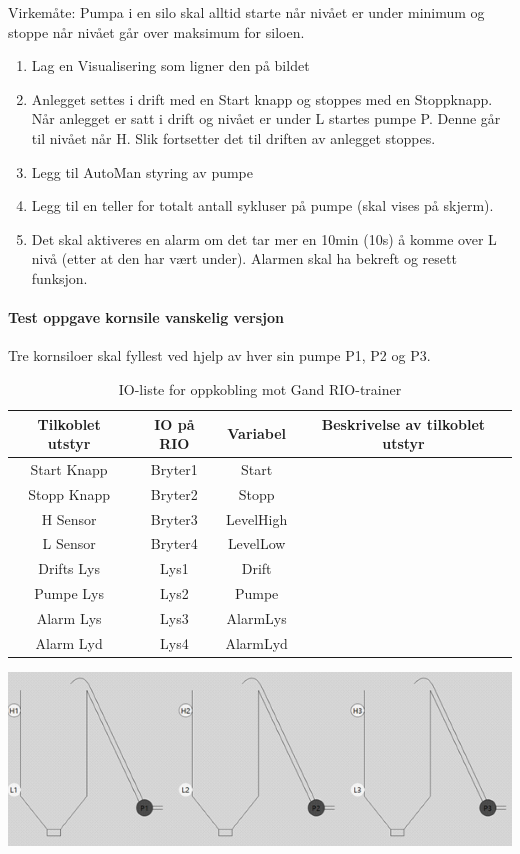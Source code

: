 \documentclass[12pt,a4paper]{article}
\begin{document}
Virkemåte: Pumpa i en silo skal alltid starte når nivået er under
minimum og stoppe når nivået går over maksimum for siloen.
\begin{enumerate}
\item Lag en Visualisering som ligner den på bildet
\item Anlegget settes i drift med en Start knapp og stoppes med en Stoppknapp.
Når anlegget er satt i drift og nivået er under L startes pumpe P.
Denne går til nivået når H. Slik fortsetter det til driften av anlegget
stoppes.
\item Legg til AutoMan styring av pumpe
\item Legg til en teller for totalt antall sykluser på pumpe (skal vises
på skjerm). 
\item Det skal aktiveres en alarm om det tar mer en 10min (10s) å komme
over L nivå (etter at den har vært under). Alarmen skal ha bekreft
og resett funksjon.
\end{enumerate}

\paragraph{Test oppgave kornsile vanskelig versjon}

Tre kornsiloer skal fyllest ved hjelp av hver sin pumpe P1, P2 og
P3. 

\begin{table}[]
\begin{centering}
\begin{tabular}{|c|c|c|c|}
\hline 
Tilkoblet utstyr & IO på RIO & Variabel & Beskrivelse av tilkoblet utstyr\tabularnewline
\hline 
\hline 
Start Knapp & Bryter1 & Start & \tabularnewline
\hline 
Stopp Knapp & Bryter2 & Stopp & \tabularnewline
\hline 
H Sensor & Bryter3 & LevelHigh & \tabularnewline
\hline 
L Sensor & Bryter4 & LevelLow & \tabularnewline
\hline 
Drifts Lys & Lys1 & Drift & \tabularnewline
\hline 
Pumpe Lys & Lys2 & Pumpe & \tabularnewline
\hline 
Alarm Lys & Lys3 & AlarmLys & \tabularnewline
\hline 
Alarm Lyd & Lys4 & AlarmLyd & \tabularnewline
\hline 
\end{tabular}
\par\end{centering}
\caption{IO-liste for oppkobling mot Gand RIO-trainer}
\end{table}

\includegraphics[width=1\textwidth]{i08012x02.png}
\end{document}
